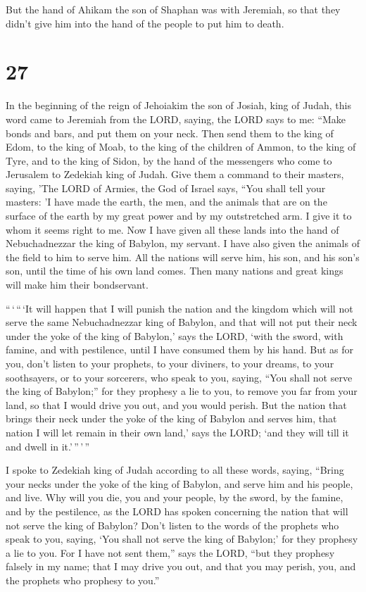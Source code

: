  But the hand of Ahikam the son of Shaphan was with
Jeremiah, so that they didn't give him into the hand of the people to
put him to death.

\hypertarget{section-26}{%
\section{27}\label{section-26}}

 In the beginning of the reign of Jehoiakim the son of
Josiah, king of Judah, this word came to Jeremiah from the LORD, saying,
 the LORD says to me: ``Make bonds and bars, and put them
on your neck.  Then send them to the king of Edom, to the
king of Moab, to the king of the children of Ammon, to the king of Tyre,
and to the king of Sidon, by the hand of the messengers who come to
Jerusalem to Zedekiah king of Judah.  Give them a command
to their masters, saying, 'The LORD of Armies, the God of Israel says,
``You shall tell your masters:  'I have made the earth,
the men, and the animals that are on the surface of the earth by my
great power and by my outstretched arm. I give it to whom it seems right
to me.  Now I have given all these lands into the hand of
Nebuchadnezzar the king of Babylon, my servant. I have also given the
animals of the field to him to serve him.  All the nations
will serve him, his son, and his son's son, until the time of his own
land comes. Then many nations and great kings will make him their
bondservant.

 ``\,`\,``\,`It will happen that I will punish the nation
and the kingdom which will not serve the same Nebuchadnezzar king of
Babylon, and that will not put their neck under the yoke of the king of
Babylon,' says the LORD, `with the sword, with famine, and with
pestilence, until I have consumed them by his hand.  But
as for you, don't listen to your prophets, to your diviners, to your
dreams, to your soothsayers, or to your sorcerers, who speak to you,
saying, ``You shall not serve the king of Babylon;''  for
they prophesy a lie to you, to remove you far from your land, so that I
would drive you out, and you would perish.  But the
nation that brings their neck under the yoke of the king of Babylon and
serves him, that nation I will let remain in their own land,' says the
LORD; `and they will till it and dwell in it.'\,''\,'\,''

 I spoke to Zedekiah king of Judah according to all these
words, saying, ``Bring your necks under the yoke of the king of Babylon,
and serve him and his people, and live.  Why will you
die, you and your people, by the sword, by the famine, and by the
pestilence, as the LORD has spoken concerning the nation that will not
serve the king of Babylon?  Don't listen to the words of
the prophets who speak to you, saying, `You shall not serve the king of
Babylon;' for they prophesy a lie to you.  For I have not
sent them,'' says the LORD, ``but they prophesy falsely in my name; that
I may drive you out, and that you may perish, you, and the prophets who
prophesy to you.''

